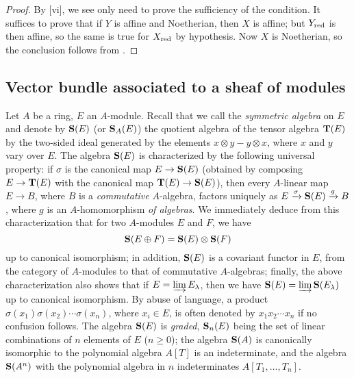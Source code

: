\begin{proof}
By [vi], we see only need to prove the sufficiency of the condition.
It suffices to prove that if $Y$ is affine and Noetherian, then $X$ is affine; but $Y_{\mathrm{red}}$ is then affine, so the same is true for $X_{\mathrm{red}}$ by hypothesis.
Now $X$ is Noetherian, so the conclusion follows from .
\end{proof}

\subsection{Vector bundle associated to a sheaf of modules}
\label{subsection:II.1.7}

\begin{env}[1.7.1]
\label{II.1.7.1}
Let $A$ be a ring, $E$ an $A$-module.
Recall that we call the \emph{symmetric algebra} on $E$ and denote by $\mathbf{S}(E)$ (or $\mathbf{S}_A(E)$) the quotient algebra of the tensor algebra $\mathbf{T}(E)$ by the two-sided ideal generated by the elements $x\otimes y-y\otimes x$, where $x$ and $y$ vary over $E$.
The algebra $\mathbf{S}(E)$ is characterized by the following universal property: if $\sigma$ is the canonical map $E\to\bb{S}(E)$ (obtained by composing $E\to\bb{T}(E)$ with the canonical map $\bb{T}(E)\to\bb{S}(E)$), then every $A$-linear map $E\to B$, where $B$ is a \emph{commutative} $A$-algebra, factors uniquely as $E\xrightarrow{\sigma}\mathbf{S}(E)\xrightarrow{g}B$, where $g$ is an $A$-homomorphism \emph{of algebras}.
We immediately deduce from this characterization that for two $A$-modules $E$ and $F$, we have
\[
  \mathbf{S}(E\oplus F)=\mathbf{S}(E)\otimes\mathbf{S}(F)
\]
up to canonical isomorphism; in addition, $\mathbf{S}(E)$ is a covariant functor in $E$, from the category of $A$-modules to that of commutative $A$-algebras; finally, the above characterization also shows that if $E=\varinjlim E_\lambda$, then we have $\mathbf{S}(E)=\varinjlim\mathbf{S}(E_\lambda)$ up to canonical isomorphism.
By abuse of language, a product $\sigma(x_1)\sigma(x_2)\cdots\sigma(x_n)$, where $x_i\in E$, is often denoted by $x_1 x_2\cdots x_n$ if no confusion follows.
The algebra $\mathbf{S}(E)$ is \emph{graded}, $\mathbf{S}_n(E)$ being the set of linear combinations of $n$ elements of $E$ ($n\geq 0$); the algebra $\mathbf{S}(A)$ is canonically isomorphic to the polynomial algebra $A[T]$ is an indeterminate, and the algebra $\mathbf{S}(A^n)$ with the polynomial algebra in $n$ indeterminates $A[T_1,\dots,T_n]$.
\end{env}

